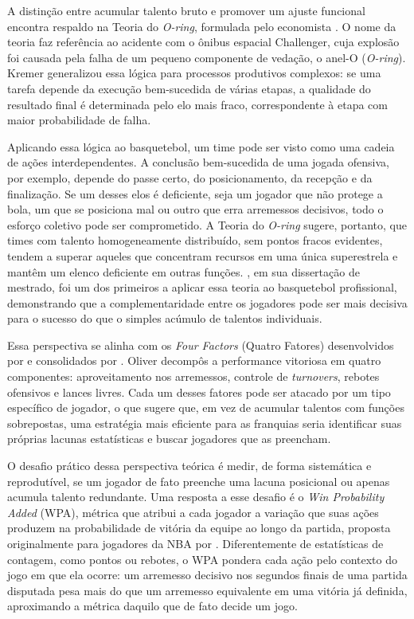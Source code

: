 A distinção entre acumular talento bruto e promover um ajuste funcional encontra respaldo na Teoria do \textit{O-ring}, formulada pelo economista \citet{kremer1993}. O nome da teoria faz referência ao acidente com o ônibus espacial Challenger, cuja explosão foi causada pela falha de um pequeno componente de vedação, o anel-O (\textit{O-ring}). Kremer generalizou essa lógica para processos produtivos complexos: se uma tarefa depende da execução bem-sucedida de várias etapas, a qualidade do resultado final é determinada pelo elo mais fraco, correspondente à etapa com maior probabilidade de falha.

Aplicando essa lógica ao basquetebol, um time pode ser visto como uma cadeia de ações interdependentes. A conclusão bem-sucedida de uma jogada ofensiva, por exemplo, depende do passe certo, do posicionamento, da recepção e da finalização. Se um desses elos é deficiente, seja um jogador que não protege a bola, um que se posiciona mal ou outro que erra arremessos decisivos, todo o esforço coletivo pode ser comprometido. A Teoria do \textit{O-ring} sugere, portanto, que times com talento homogeneamente distribuído, sem pontos fracos evidentes, tendem a superar aqueles que concentram recursos em uma única superestrela e mantêm um elenco deficiente em outras funções. \citet{ching2019}, em sua dissertação de mestrado, foi um dos primeiros a aplicar essa teoria ao basquetebol profissional, demonstrando que a complementaridade entre os jogadores pode ser mais decisiva para o sucesso do que o simples acúmulo de talentos individuais.

Essa perspectiva se alinha com os \textit{Four Factors} (Quatro Fatores) desenvolvidos por \citet{oliver2004} e consolidados por \citet{kubatko2007}. Oliver decompôs a performance vitoriosa em quatro componentes: aproveitamento nos arremessos, controle de \textit{turnovers}, rebotes ofensivos e lances livres. Cada um desses fatores pode ser atacado por um tipo específico de jogador, o que sugere que, em vez de acumular talentos com funções sobrepostas, uma estratégia mais eficiente para as franquias seria identificar suas próprias lacunas estatísticas e buscar jogadores que as preencham.

O desafio prático dessa perspectiva teórica é medir, de forma sistemática e reprodutível, se um jogador de fato preenche uma lacuna posicional ou apenas acumula talento redundante. Uma resposta a esse desafio é o \textit{Win Probability Added} (WPA), métrica que atribui a cada jogador a variação que suas ações produzem na probabilidade de vitória da equipe ao longo da partida, proposta originalmente para jogadores da NBA por \citet{deshpande2016}. Diferentemente de estatísticas de contagem, como pontos ou rebotes, o WPA pondera cada ação pelo contexto do jogo em que ela ocorre: um arremesso decisivo nos segundos finais de uma partida disputada pesa mais do que um arremesso equivalente em uma vitória já definida, aproximando a métrica daquilo que de fato decide um jogo.


